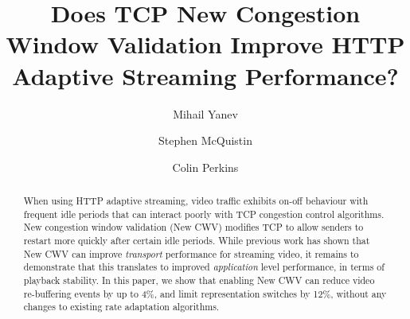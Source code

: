 \documentclass[10pt,sigconf]{acmart}
\begin{document}
\title{Does TCP New Congestion Window Validation Improve HTTP Adaptive Streaming Performance?}

\author{Mihail Yanev}

  \author{Stephen McQuistin}

\author{Colin Perkins}


\begin{abstract}

When using HTTP adaptive streaming, video traffic exhibits on-off behaviour with frequent idle periods that can interact poorly with TCP congestion control algorithms. New congestion window validation (New CWV) modifies TCP to allow senders to restart more quickly after certain idle periods. While previous work has shown that New CWV can improve \emph{transport} performance for streaming video, it remains to demonstrate that this translates to improved \emph{application} level performance, in terms of playback stability. In this paper, we show that enabling New CWV can reduce video re-buffering events by up to 4\%, and limit representation switches by 12\%, without any changes to existing rate adaptation algorithms.

\end{abstract}
\maketitle
\end{document}
